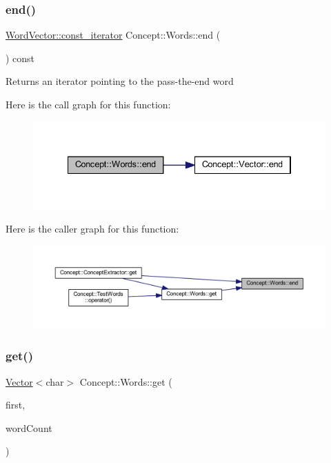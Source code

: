 \subsubsection{\texorpdfstring{end()}{end()}}
{\footnotesize\ttfamily \mbox{\hyperlink{class_concept_1_1_vector}{Word\+Vector\+::const\+\_\+iterator}} Concept\+::\+Words\+::end (\begin{DoxyParamCaption}{ }\end{DoxyParamCaption}) const\hspace{0.3cm}{\ttfamily [inline]}}

\begin{DoxyReturn}{Returns}
an iterator pointing to the pass-\/the-\/end word 
\end{DoxyReturn}
Here is the call graph for this function\+:\nopagebreak
\begin{figure}[H]
\begin{center}
\leavevmode
\includegraphics[width=334pt]{class_concept_1_1_words_a9d52168c7d5655db4aaf8959c011f549_cgraph}
\end{center}
\end{figure}
Here is the caller graph for this function\+:\nopagebreak
\begin{figure}[H]
\begin{center}
\leavevmode
\includegraphics[width=350pt]{class_concept_1_1_words_a9d52168c7d5655db4aaf8959c011f549_icgraph}
\end{center}
\end{figure}
\mbox{\label{class_concept_1_1_words_a96f098f0ad1a12e098ad515bf1e38fd1}} 
\subsubsection{\texorpdfstring{get()}{get()}}
{\footnotesize\ttfamily \mbox{\hyperlink{class_concept_1_1_vector}{Vector}}$<$char$>$ Concept\+::\+Words\+::get (\begin{DoxyParamCaption}\item[{\mbox{\hyperlink{class_concept_1_1_vector}{Word\+Vector\+::const\+\_\+iterator}}}]{first,  }\item[{size\+\_\+t}]{word\+Count }\end{DoxyParamCaption})\hspace{0.3cm}{\ttfamily [inline]}}

